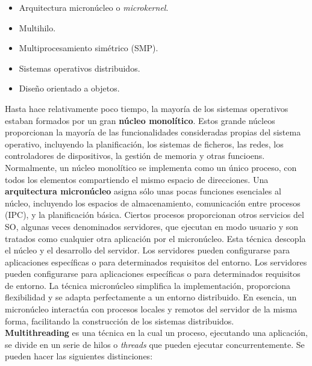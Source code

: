 \documentclass{article}
\begin{document}
			\begin{itemize}
			\item Arquitectura micronúcleo o \textit{microkernel}.
			\item Multihilo.
			\item Multiprocesamiento simétrico (SMP).
			\item Sistemas operativos distribuidos.
			\item Diseño orientado a objetos.
			\end{itemize}
			
			Hasta hace relativamente poco tiempo, la mayoría de los sistemas operativos estaban formados por un gran \textbf{núcleo monolítico}. Estos grande núcleos proporcionan la mayoría de las funcionalidades consideradas propias del sistema operativo, incluyendo la planificación, los sistemas de ficheros, las redes, los controladores de dispositivos, la gestión de memoria y otras funcioens. Normalmente, un núcleo monolítico se implementa como un único proceso, con todos los elementos compartiendo el mismo espacio de direcciones. Una \textbf{arquitectura micronúcleo} asigna sólo unas pocas funciones esenciales al núcleo, incluyendo los espacios de almacenamiento, comunicación entre procesos (IPC), y la planificación básica. Ciertos procesos proporcionan otros servicios del SO, algunas veces denominados servidores, que ejecutan en modo usuario y son tratados como cualquier otra aplicación por el micronúcleo. Esta técnica descopla el núcleo y el desarrollo del servidor. Los servidores pueden configurarse para aplicaciones específicas o para determinados requisitos del entorno. Los servidores pueden configurarse para aplicaciones específicas o para determinados requisitos de entorno. La técnica micronúcleo simplifica la implementación, proporciona flexibilidad y se adapta perfectamente a un entorno distribuido. En esencia, un micronúcleo interactúa con procesos locales y remotos del servidor de la misma forma, facilitando la construcción de los sistemas distribuidos. \\
			
			\textbf{Multithreading} es una técnica en la cual un proceso, ejecutando una aplicación, se divide en un serie de hilos o \textit{threads} que pueden ejecutar concurrentemente. Se pueden hacer las siguientes distinciones:
			
\end{document}
